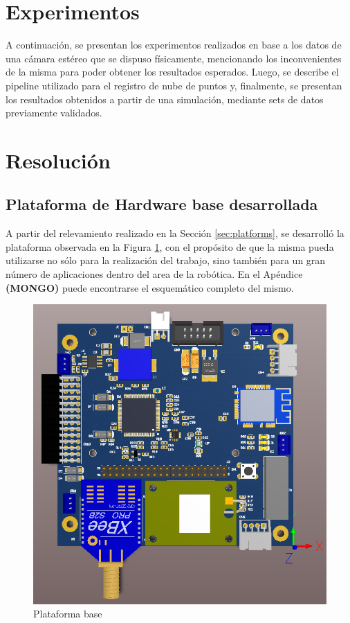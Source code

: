\ifimagenes
\section{Experimentos}
A continuación, se presentan los experimentos realizados en base a los datos de una cámara estéreo que se dispuso físicamente, mencionando los inconvenientes de la misma para poder obtener los resultados esperados. Luego, se describe el pipeline utilizado para el registro de nube de puntos y, finalmente, se presentan los resultados obtenidos a partir de una simulación, mediante sets de datos previamente validados.
\else
\section{Resolución}
\subsection{Plataforma de Hardware base desarrollada}
A partir del relevamiento realizado en la Sección \ref{sec:platforms}, se desarrolló la plataforma observada en la Figura \ref{fig:baseboardv2_1}, con el propósito de que la misma pueda utilizarse no sólo para la realización del trabajo, sino también para un gran número de aplicaciones dentro del area de la robótica. En el Apéndice \textbf{(MONGO)} puede encontrarse el esquemático completo del mismo.

\begin{figure}[!ht]
    \centering
    \includegraphics[width=\textwidth]{Img/BaseBoardV2_1.png}
    \caption{Plataforma base}
    \label{fig:baseboardv2_1}
\end{figure}

